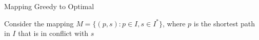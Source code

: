 \begin{frame}{Mapping Greedy to Optimal}

{Consider the mapping
$M = \{(p, s) : p \in I, s \in I^*\}$,
where $p$ is the shortest path in $I$ that is in conflict with $s$}



\end{frame}